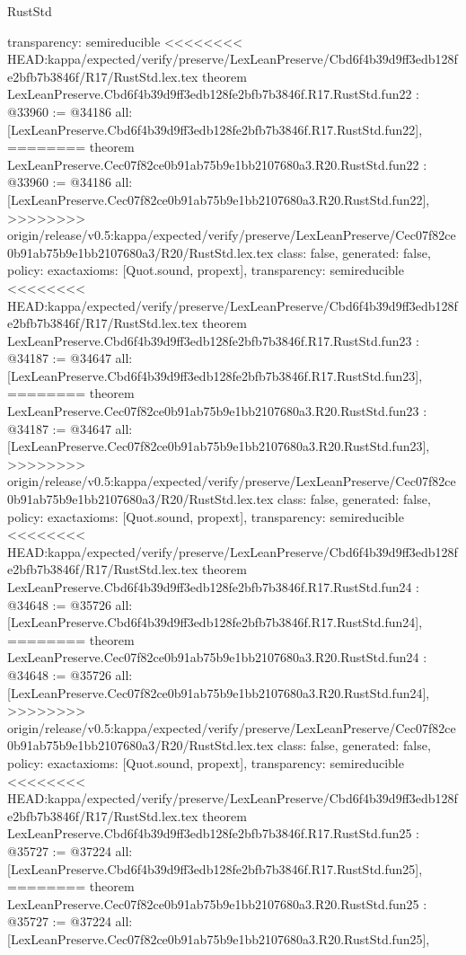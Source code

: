 \begin{lexlean}{RustStd}
\begin{coremodule}
{\begin{coremodule}
{{{{{{{{{{{{{{{{{{{{{{{{{  transparency: semireducible
}
<<<<<<<< HEAD:kappa/expected/verify/preserve/LexLeanPreserve/Cbd6f4b39d9ff3edb128fe2bfb7b3846f/R17/RustStd.lex.tex
theorem LexLeanPreserve.Cbd6f4b39d9ff3edb128fe2bfb7b3846f.R17.RustStd.fun22 : @33960 := @34186 {
  all: [LexLeanPreserve.Cbd6f4b39d9ff3edb128fe2bfb7b3846f.R17.RustStd.fun22],
========
theorem LexLeanPreserve.Cec07f82ce0b91ab75b9e1bb2107680a3.R20.RustStd.fun22 : @33960 := @34186 {
  all: [LexLeanPreserve.Cec07f82ce0b91ab75b9e1bb2107680a3.R20.RustStd.fun22],
>>>>>>>> origin/release/v0.5:kappa/expected/verify/preserve/LexLeanPreserve/Cec07f82ce0b91ab75b9e1bb2107680a3/R20/RustStd.lex.tex
  class: false,
  generated: false,
  policy: exact{axioms: [Quot.sound, propext]},
  transparency: semireducible
}
<<<<<<<< HEAD:kappa/expected/verify/preserve/LexLeanPreserve/Cbd6f4b39d9ff3edb128fe2bfb7b3846f/R17/RustStd.lex.tex
theorem LexLeanPreserve.Cbd6f4b39d9ff3edb128fe2bfb7b3846f.R17.RustStd.fun23 : @34187 := @34647 {
  all: [LexLeanPreserve.Cbd6f4b39d9ff3edb128fe2bfb7b3846f.R17.RustStd.fun23],
========
theorem LexLeanPreserve.Cec07f82ce0b91ab75b9e1bb2107680a3.R20.RustStd.fun23 : @34187 := @34647 {
  all: [LexLeanPreserve.Cec07f82ce0b91ab75b9e1bb2107680a3.R20.RustStd.fun23],
>>>>>>>> origin/release/v0.5:kappa/expected/verify/preserve/LexLeanPreserve/Cec07f82ce0b91ab75b9e1bb2107680a3/R20/RustStd.lex.tex
  class: false,
  generated: false,
  policy: exact{axioms: [Quot.sound, propext]},
  transparency: semireducible
}
<<<<<<<< HEAD:kappa/expected/verify/preserve/LexLeanPreserve/Cbd6f4b39d9ff3edb128fe2bfb7b3846f/R17/RustStd.lex.tex
theorem LexLeanPreserve.Cbd6f4b39d9ff3edb128fe2bfb7b3846f.R17.RustStd.fun24 : @34648 := @35726 {
  all: [LexLeanPreserve.Cbd6f4b39d9ff3edb128fe2bfb7b3846f.R17.RustStd.fun24],
========
theorem LexLeanPreserve.Cec07f82ce0b91ab75b9e1bb2107680a3.R20.RustStd.fun24 : @34648 := @35726 {
  all: [LexLeanPreserve.Cec07f82ce0b91ab75b9e1bb2107680a3.R20.RustStd.fun24],
>>>>>>>> origin/release/v0.5:kappa/expected/verify/preserve/LexLeanPreserve/Cec07f82ce0b91ab75b9e1bb2107680a3/R20/RustStd.lex.tex
  class: false,
  generated: false,
  policy: exact{axioms: [Quot.sound, propext]},
  transparency: semireducible
}
<<<<<<<< HEAD:kappa/expected/verify/preserve/LexLeanPreserve/Cbd6f4b39d9ff3edb128fe2bfb7b3846f/R17/RustStd.lex.tex
theorem LexLeanPreserve.Cbd6f4b39d9ff3edb128fe2bfb7b3846f.R17.RustStd.fun25 : @35727 := @37224 {
  all: [LexLeanPreserve.Cbd6f4b39d9ff3edb128fe2bfb7b3846f.R17.RustStd.fun25],
========
theorem LexLeanPreserve.Cec07f82ce0b91ab75b9e1bb2107680a3.R20.RustStd.fun25 : @35727 := @37224 {
  all: [LexLeanPreserve.Cec07f82ce0b91ab75b9e1bb2107680a3.R20.RustStd.fun25],
}}}}}}}}}}}}}}}}}}}}}}}}}}}}}
\end{coremodule}}
\end{coremodule}
\end{lexlean}
